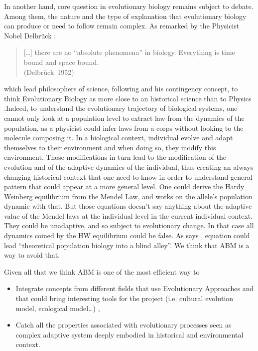 \documentclass[a4paper]{article}
\begin{document}
In another hand, core question in evolutionary biology remains subject to debate. Among them, the  nature and the type of explanation that evolutionary biology can produce or need to follow remain complex. As remarked by the Physicist Nobel Delbrück :
\begin{quote}
	[\ldots] there are no ``absolute phenomena'' in biology. Everything is time bound and space bound. \\
	(Delbrück~1952)
\end{quote}
which lead philosophers of science, following \cite{gould1989wonderfullife} and his contingency concept, to think Evolutionary Biology as more close to an historical science than to Physics \cite{beatty1995theevolutionarycontingencythesis}.Indeed, to understand the evolutionary trajectory of biological systems, one cannot only look at a population level to extract law from the dynamics of the population, as a physicist could infer laws from a corps without looking to the molecule composing it. In a biological context, individual evolve and adapt themselves to their environment and when doing so, they modify this environment. Those modifications in turn lead to the modification of the evolution and of the adaptive dynamics of the individual, thus creating an always changing historical context that one need to know in order to understand general pattern that could appear at a more general level. One could derive the Hardy Weinberg equilibrium from the Mendel Law, and works on the allele's population dynamic with that. But those equations doesn't say anything about the adaptive value of the Mendel laws at the individual level in the current individual context. They could be unadaptive, and so subject to evolutionary change. In that case all dynamics coined by the HW equilibrium could be false. As says \cite{lomnicki1978individualdifferencesbetweenanimalsandthenaturalregulationoftheirnumbers}, equation could lead ``theoretical population biology into a blind alley''. We think that ABM is a way to avoid that.


Given all that we think ABM is one of the most efficient way to 
\begin{itemize}
	\item Integrate concepts from different fields that use Evolutionary Approaches and that could bring interesting tools for the project (i.e. cultural evolution model, ecological model\ldots) ,
	\item Catch all the properties associated with evolutionary processes seen as complex adaptive system deeply embodied in historical and environmental context.
\end{itemize}
\end{document}
